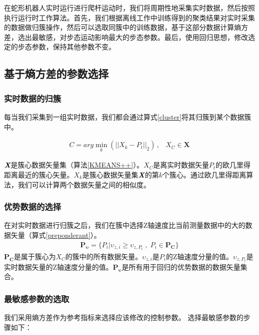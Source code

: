 在蛇形机器人实时运行进行爬杆运动时，我们将周期性地采集实时数据，然后按照执行运行时工作算法。首先，我们根据离线工作中训练得到的聚类结果对实时采集的数据做归簇操作，然后可以选取同簇中的训练数据，基于这部分数据计算熵方差，选出最敏感，对步态运动影响最大的步态参数。最后，使用回归思想，修改选定的步态参数，保持其他参数不变。

\subsection{基于熵方差的参数选择}
\subsubsection{实时数据的归簇}
每当我们采集到一组实时数据，我们都会通过算式\ref{cluster}将其归簇到某个数据簇中。

\begin{eqnarray}\label{cluster}
C=arg\min \limits_{k}{(||X_{k}-P_{t}||_{2})} \, ,&X_{C}\in \bm{X}
\end{eqnarray}

$\textit{\textbf{X}}$是簇心数据矢量集（算法\ref{KMEANS++}）。$X_{C}$是离实时数据矢量$P_t$的欧几里得距离最近的簇心矢量。$X_{k}$是簇心数据矢量集$\textit{\textbf{X}}$的第$k$个簇心。通过欧几里得距离算法，我们可以计算两个数据矢量之间的相似度。

\subsubsection{优势数据的选择}
在对实时数据进行归簇之后，我们在簇中选择Z轴速度比当前测量数据中的大的数据矢量（算式\ref{preponderant}）。
\begin{eqnarray}\label{preponderant}
\bm{P_{\upsilon}}=\{P_{i} | \upsilon_{z,i}\geq \upsilon_{z,P_{t}} \; , \; P_{i}\in \bm{P_{C}}\}
\end{eqnarray}
$\bm{P_{C}}$是属于簇心为$X_{C}$的簇中的所有数据矢量。$\upsilon_{z,i}$是$P_{i}$的Z轴速度分量的值。$\upsilon_{z,P_{t}}$是实时数据矢量的Z轴速度分量的值。$\bm{P_{\upsilon}}$是所有用于回归的优势数据的数据矢量集合。

\subsubsection{最敏感参数的选取}
我们采用熵方差作为参考指标来选择应该修改的控制参数。 选择最敏感参数的步骤如下：

